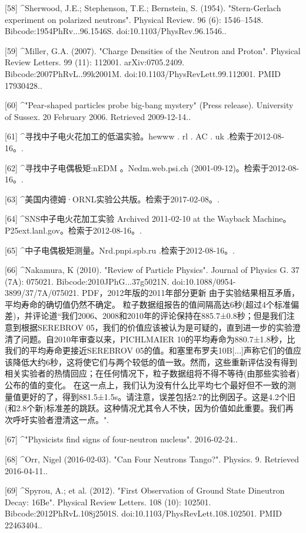 [58]
^Sherwood, J.E.; Stephenson, T.E.; Bernstein, S. (1954). "Stern-Gerlach experiment on polarized neutrons". Physical Review. 96 (6): 1546–1548. Bibcode:1954PhRv...96.1546S. doi:10.1103/PhysRev.96.1546..

[59]
^Miller, G.A. (2007). "Charge Densities of the Neutron and Proton". Physical Review Letters. 99 (11): 112001. arXiv:0705.2409. Bibcode:2007PhRvL..99k2001M. doi:10.1103/PhysRevLett.99.112001. PMID 17930428..

[60]
^"Pear-shaped particles probe big-bang mystery" (Press release). University of Sussex. 20 February 2006. Retrieved 2009-12-14..

[61]
^寻找中子电火花加工的低温实验。hewww . rl . AC . uk .检索于2012-08-16。.

[62]
^寻找中子电偶极矩:nEDM 。Nedm.web.psi.ch (2001-09-12)。检索于2012-08-16。.

[63]
^美国内德姆·ORNL实验公共版。检索于2017-02-08。.

[64]
^SNS中子电火花加工实验 Archived 2011-02-10 at the Wayback Machine。P25ext.lanl.gov。检索于2012-08-16。.

[65]
^中子电偶极矩测量。Nrd.pnpi.spb.ru .检索于2012-08-16。.

[66]
^Nakamura, K (2010). "Review of Particle Physics". Journal of Physics G. 37 (7A): 075021. Bibcode:2010JPhG...37g5021N. doi:10.1088/0954-3899/37/7A/075021. PDF，2012年版的2011年部分更新 由于实验结果相互矛盾，平均寿命的确切值仍然不确定。 粒子数据组报告的值间隔高达6秒(超过4个标准偏差)，并评论道“我们2006、2008和2010年的评论保持在885.7±0.8秒；但是我们注意到根据SEREBROV 05，我们的价值应该被认为是可疑的，直到进一步的实验澄清了问题。自2010年审查以来，PICHLMAIER 10的平均寿命为880.7±1.8秒，比我们的平均寿命更接近SEREBROV 05的值。和塞里布罗夫10B[...]声称它们的值应该降低大约6秒，这将使它们与两个较低的值一致。然而，这些重新评估没有得到相关实验者的热情回应；在任何情况下，粒子数据组将不得不等待(由那些实验者)公布的值的变化。 在这一点上，我们认为没有什么比平均七个最好但不一致的测量值更好的了，得到881.5±1.5s。请注意，误差包括2.7的比例因子。这是4.2个旧(和2.8个新)标准差的跳跃。这种情况尤其令人不快，因为价值如此重要。我们再次呼吁实验者澄清这一点。".

[67]
^"Physicists find signs of four-neutron nucleus". 2016-02-24..

[68]
^Orr, Nigel (2016-02-03). "Can Four Neutrons Tango?". Physics. 9. Retrieved 2016-04-11..

[69]
^Spyrou, A.; et al. (2012). "First Observation of Ground State Dineutron Decay: 16Be". Physical Review Letters. 108 (10): 102501. Bibcode:2012PhRvL.108j2501S. doi:10.1103/PhysRevLett.108.102501. PMID 22463404..

